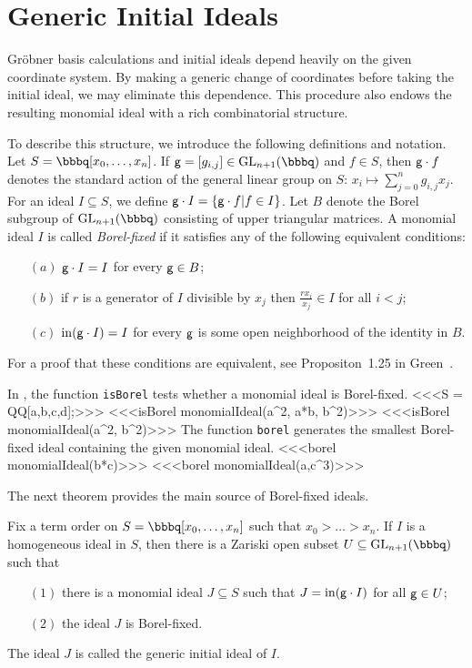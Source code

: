 \section{Generic Initial Ideals}

Gr\"{o}bner basis calculations and initial ideals depend heavily on
the given coordinate system.  By making a generic change of coordinates
before taking the initial ideal, we may eliminate this dependence.
This procedure also endows the resulting monomial ideal with a rich
combinatorial structure.

To describe this structure, we introduce the following definitions and
notation.  Let $S = \bbbq[x_{0}, \dotsc, x_{n}]$.  If $\sg = [g_{i,j}]
\in \GL_{n+1}(\bbbq)$ and $f \in S$, then ${\sf g} \cdot f$ denotes the
standard action of the general linear group on $S$: $x_{i} \mapsto
\sum_{j=0}^{n} g_{i,j} x_{j}$.  For an ideal $I \subseteq S$, we
define ${\sf g} \cdot I = \{ {\sf g} \cdot f | f \in I \}$.  Let $B$ denote
the Borel subgroup of $\GL_{n+1}(\bbbq)$ consisting of upper
triangular matrices.  A monomial ideal $I$ is called
{\em Borel-fixed} if it
satisfies any of the following equivalent conditions:
\begin{enumerate}
\item[$(a)$] ${\sf g} \cdot I = I$ for every ${\sf g} \in B$;
\item[$(b)$] if $r$ is a generator of $I$ divisible by $x_{j}$ then
$\frac{rx_{i}}{x_{j}} \in I$ for all $i < j$;
\item[$(c)$] $\operatorname{in}({\sf g} \cdot I) = I$ for every ${\sf g}$ is some open
neighborhood of the identity in $B$.
\end{enumerate}
For a proof that these conditions are equivalent, see Propositon~1.25
in Green~\cite{MR99m:13040}.  

In \Mtwo, the function {\tt isBorel} tests whether a monomial ideal is
Borel-fixed.
<<<S = QQ[a,b,c,d];>>>
<<<isBorel monomialIdeal(a^2, a*b, b^2)>>>
<<<isBorel monomialIdeal(a^2, b^2)>>>
The function {\tt borel} generates the smallest Borel-fixed ideal
containing the given monomial ideal.
<<<borel monomialIdeal(b*c)>>>
<<<borel monomialIdeal(a,c^3)>>>

The next theorem provides the main source of Borel-fixed ideals.
\begin{theorem}[Galligo] \label{galligo}
Fix a term order on $S = \bbbq[x_{0}, \dotsc, x_{n}]$ such that $x_{0}
> \dotsc > x_{n}$.  If $I$ is a homogeneous ideal in $S$, then there
is a Zariski open subset $U \subseteq \GL_{n+1}(\bbbq)$ such that
\begin{enumerate}
\item[$(1)$] there is a monomial ideal $J \subseteq S$ such that $J =
\operatorname{in}({\sf g} \cdot I )$ for all ${\sf g} \in U$;
\item[$(2)$] the ideal $J$ is Borel-fixed.
\end{enumerate}
The ideal $J$ is called the generic initial ideal of $I$.
\end{theorem}

